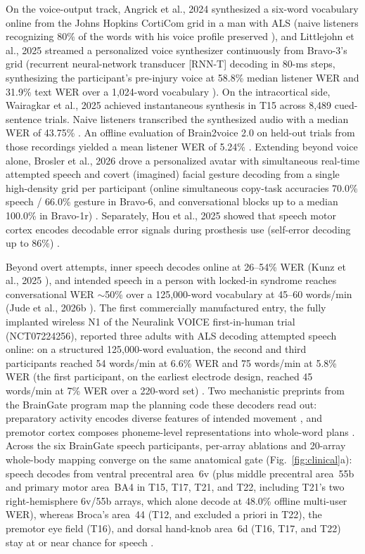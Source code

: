 \documentclass[11pt]{article}
\newcommand{\wpm}{words/min}
\begin{document}
On the voice-output track, Angrick et al., 2024 synthesized a six-word
vocabulary online from the Johns Hopkins CortiCom grid in a man with ALS
(naive listeners recognizing 80\% of the words with his voice profile
preserved \cite{angrick2024}), and Littlejohn et al., 2025 streamed a
personalized voice synthesizer continuously from Bravo-3's grid
(recurrent neural-network transducer [RNN-T] decoding in 80-ms steps,
synthesizing the participant's pre-injury voice at 58.8\% median
listener WER and 31.9\% text WER over a 1{,}024-word vocabulary
\cite{littlejohn2025}). On the intracortical side, Wairagkar et al.,
2025 achieved instantaneous synthesis in T15 across 8{,}489
cued-sentence trials. Naive listeners transcribed the synthesized audio
with a median WER of 43.75\% \cite{wairagkar2025}. An offline evaluation
of Brain2voice 2.0 on held-out trials from those recordings yielded a
mean listener WER of 5.24\% \cite{wairagkar2026}. Extending beyond voice
alone, Brosler et al., 2026 drove a personalized avatar with
simultaneous real-time attempted speech and covert (imagined) facial
gesture decoding from a single high-density grid per participant (online
simultaneous copy-task accuracies 70.0\% speech / 66.0\% gesture in
Bravo-6, and conversational blocks up to a median 100.0\% in Bravo-1r)
\cite{brosler2026}. Separately, Hou et al., 2025 showed that speech
motor cortex encodes decodable error signals during prosthesis use
(self-error decoding up to 86\%) \cite{hou2025}.

Beyond overt attempts, inner speech decodes online at 26--54\% WER (Kunz
et al., 2025 \cite{kunz2025}), and intended speech in a person with
locked-in syndrome reaches conversational WER $\sim$50\% over a
125{,}000-word vocabulary at 45--60 \wpm{} (Jude et al., 2026b
\cite{jude2026lis}). The first commercially manufactured entry, the
fully implanted wireless N1 of the Neuralink VOICE first-in-human trial
(NCT07224256), reported three adults with ALS decoding attempted speech
online: on a structured 125{,}000-word evaluation, the second and third
participants reached 54 \wpm{} at 6.6\% WER and 75 \wpm{} at 5.8\% WER
(the first participant, on the earliest electrode design, reached 45
\wpm{} at 7\% WER over a 220-word set) \cite{pouratian2026}. Two
mechanistic preprints from the BrainGate program map the planning code
these decoders read out: preparatory activity encodes diverse features
of intended movement \cite{rigotti2025}, and premotor cortex composes
phoneme-level representations into whole-word plans
\cite{abramovich2026}. Across the six BrainGate speech participants,
per-array ablations and 20-array whole-body mapping \cite{deo2026}
converge on the same anatomical gate (Fig.~\ref{fig:clinical}a):
speech decodes from ventral precentral area~6v (plus middle precentral
area~55b and primary motor area~BA4 in T15, T17, T21, and T22, including
T21's two right-hemisphere 6v/55b arrays, which alone decode at 48.0\%
offline multi-user WER), whereas Broca's area~44 (T12, and excluded a
priori in T22), the premotor eye field (T16), and dorsal hand-knob
area~6d (T16, T17, and T22) stay at or near chance for speech
\cite{willett2023, jude2026lis, kunz2025, fogg2026, deo2026}.
\end{document}
